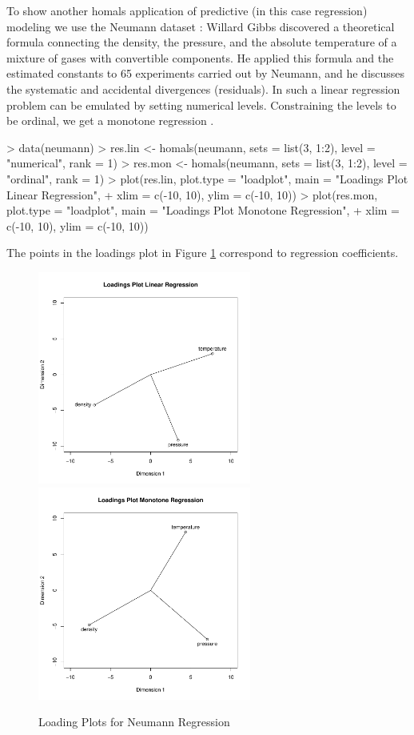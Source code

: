 \documentclass[article]{jss1}
\begin{document}
To show another homals application of predictive (in this case regression) modeling we use the Neumann dataset \citep{Wilson:26}: Willard Gibbs discovered a theoretical formula connecting the density, the
pressure, and the absolute temperature of a mixture of gases with convertible 
components. He applied this formula and the estimated constants to 65 experiments
carried out by Neumann, and he discusses the systematic and accidental divergences (residuals). In  such a linear regression problem can be emulated by setting numerical levels. Constraining the levels to be ordinal, we get a monotone regression \citep{Gifi:90}. 

\begin{Schunk}
\begin{Sinput}
> data(neumann)
> res.lin <- homals(neumann, sets = list(3, 1:2), level = "numerical", rank = 1)
> res.mon <- homals(neumann, sets = list(3, 1:2), level = "ordinal", rank = 1)
> plot(res.lin, plot.type = "loadplot", main = "Loadings Plot Linear Regression",
+ xlim = c(-10, 10), ylim = c(-10, 10))
> plot(res.mon, plot.type = "loadplot", main = "Loadings Plot Monotone Regression",
+ xlim = c(-10, 10), ylim = c(-10, 10))
\end{Sinput}
\end{Schunk}

The points in the loadings plot in Figure \ref{fig:neuload} correspond to regression coefficients.

\begin{figure}[hbt]
\begin{center}
\includegraphics[height=70mm, width=70mm]{neuloadlin.pdf}
\includegraphics[height=70mm, width=70mm]{neuloadmon.pdf}
\caption{\label{fig:neuload}Loading Plots for Neumann Regression}
\end{center}
\end{figure}
\end{document}

